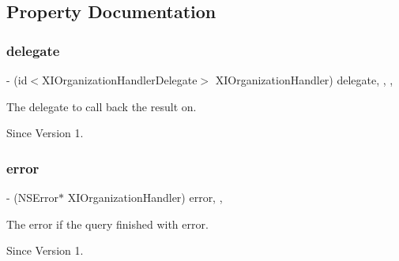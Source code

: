 \subsection{Property Documentation}
\hypertarget{protocol_x_i_organization_handler_01-p_a2a1851bcf9cbac6a5a8f2f18f566fd0c}{}\label{protocol_x_i_organization_handler_01-p_a2a1851bcf9cbac6a5a8f2f18f566fd0c} 
\subsubsection{\texorpdfstring{delegate}{delegate}}
{\footnotesize\ttfamily -\/ (id$<$X\+I\+Organization\+Handler\+Delegate$>$ X\+I\+Organization\+Handler) delegate\hspace{0.3cm}{\ttfamily [read]}, {\ttfamily [write]}, {\ttfamily [nonatomic]}, {\ttfamily [weak]}}



The delegate to call back the result on. 

\begin{DoxySince}{Since}
Version 1. 
\end{DoxySince}
\hypertarget{protocol_x_i_organization_handler_01-p_a10736d88a59d4ad85fedcdf041888401}{}\label{protocol_x_i_organization_handler_01-p_a10736d88a59d4ad85fedcdf041888401} 
\subsubsection{\texorpdfstring{error}{error}}
{\footnotesize\ttfamily -\/ (N\+S\+Error$\ast$ X\+I\+Organization\+Handler) error\hspace{0.3cm}{\ttfamily [read]}, {\ttfamily [nonatomic]}, {\ttfamily [assign]}}



The error if the query finished with error. 

\begin{DoxySince}{Since}
Version 1. 
\end{DoxySince}
\hypertarget{protocol_x_i_organization_handler_01-p_aaab2f6fa3c8134fe4d726ab87538fdd4}{}\label{protocol_x_i_organization_handler_01-p_aaab2f6fa3c8134fe4d726ab87538fdd4} 

